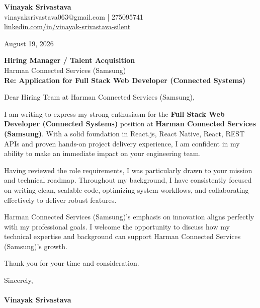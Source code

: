 \documentclass[11pt,a4paper]{article}
\begin{document}
\thispagestyle{empty}

{\Large \textbf{Vinayak Srivastava}}\\
vinayaksrivastava063@gmail.com | 275095741 \\
\url{linkedin.com/in/vinayak-srivastava-silent}

\vspace{1em}
\hfill August 19, 2026

\textbf{Hiring Manager / Talent Acquisition}\\
Harman Connected Services (Samsung)\\

\vspace{1.5em}
\textbf{Re: Application for Full Stack Web Developer (Connected Systems)}

\vspace{1em}
Dear Hiring Team at Harman Connected Services (Samsung),

I am writing to express my strong enthusiasm for the \textbf{Full Stack Web Developer (Connected Systems)} position at \textbf{Harman Connected Services (Samsung)}. With a solid foundation in React.js, React Native, React, REST APIs and proven hands-on project delivery experience, I am confident in my ability to make an immediate impact on your engineering team.

Having reviewed the role requirements, I was particularly drawn to your mission and technical roadmap. Throughout my background, I have consistently focused on writing clean, scalable code, optimizing system workflows, and collaborating effectively to deliver robust features.

Harman Connected Services (Samsung)'s emphasis on innovation aligns perfectly with my professional goals. I welcome the opportunity to discuss how my technical expertise and background can support Harman Connected Services (Samsung)'s growth.

Thank you for your time and consideration.

\vspace{1.5em}
Sincerely,\\
\vspace{1em}\\
\textbf{Vinayak Srivastava}
\end{document}
